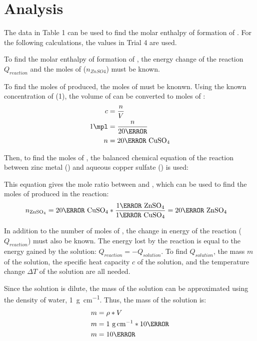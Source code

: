 \documentclass[demo, 12pt, notitlepage, letterpaper]{report}
\begin{document}
\section*{Analysis}

The data in Table 1 can be used to find the molar enthalpy of formation of . For the following calculations, the values in Trial 4 are used.

To find the molar enthalpy of formation of , the energy change of the reaction $Q_{reaction}$ and the moles of  ($n_{ZnSO4}$) must be known.

To find the moles of  produced, the moles of  must be knonwn. Using the known concentration of  (1\mpl), the volume of  can be converted to moles of :
\begin{align*}
	c     & = \frac{n}{V}        \\
	1\mpl & = \frac{n}{20\ml}    \\
	n     & = 20\mmol~\ce{CuSO4}
\end{align*}

Then, to find the moles of , the balanced chemical equation of the reaction between zinc metal () and aqueous copper sulfate () is used:

\centerline{}

This equation gives the mole ratio between  and , which can be used to find the moles of  produced in the reaction:
\begin{align*}
	n_{\ce{ZnSO4}} & = 20\mmol~\ce{CuSO4} * \frac{1\mol~{\ce{ZnSO4}}}{1\mol~{\ce{CuSO4}}} = 20\mmol~{\ce{ZnSO4}}
\end{align*}

In addition to the number of moles of , the change in energy of the reaction ($Q_{reaction}$) must also be known. The energy lost by the reaction is equal to the energy gained by the solution: $Q_{reaction} = -Q_{solution}$. To find $Q_{solution}$, the mass $m$ of the solution, the specific heat capacity $c$ of the solution, and the temperature change $\Delta T$ of the solution are all needed.

Since the solution is dilute, the mass of the solution can be approximated using the density of water, 1~\unit{\gram\per\cm}. Thus, the mass of the solution is:
\begin{align*}
	m & = \rho * V                      \\
	m & = 1~\unit{\gram\per\cm} * 10\ml \\
	m & = 10\gram
\end{align*}
\end{document}
